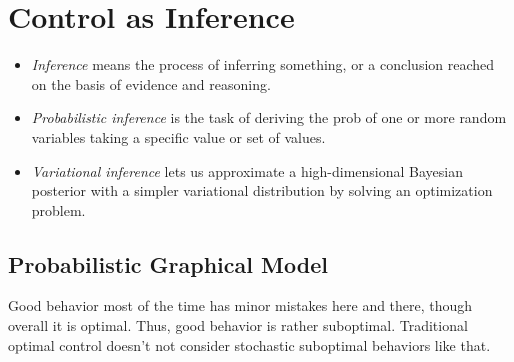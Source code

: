 \chapter{Control as Inference}

\begin{itemize}
	\item \textit{Inference} means the process of inferring something, or a conclusion reached on the basis of evidence and reasoning.	
	\item \textit{Probabilistic inference} is the task of deriving the \ac{prob} of one or more random variables taking a specific value or set of values.
	\item \textit{Variational inference} lets us approximate a high-dimensional Bayesian posterior with a simpler variational distribution by solving an optimization problem.
\end{itemize}

\section{Probabilistic Graphical Model}
\label{sec:probabilistic-graphical-model}
Good behavior most of the time has minor mistakes here and there, though overall it is optimal. Thus, good behavior is rather suboptimal. Traditional optimal control doesn't not consider stochastic suboptimal behaviors like that.

